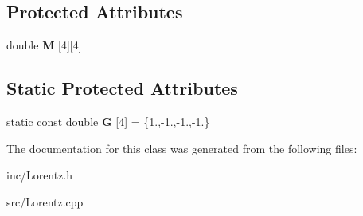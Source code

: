 \subsection*{Protected Attributes}
\begin{DoxyCompactItemize}
\item 
\hypertarget{classLT_adfe83a60779798fcb358f2fb12d79cda}{double {\bfseries M} \mbox{[}4\mbox{]}\mbox{[}4\mbox{]}}\label{classLT_adfe83a60779798fcb358f2fb12d79cda}

\end{DoxyCompactItemize}
\subsection*{Static Protected Attributes}
\begin{DoxyCompactItemize}
\item 
\hypertarget{classLT_a3ec591d3e26134d35eb127d0610c7866}{static const double {\bfseries G} \mbox{[}4\mbox{]} = \{1.,-\/1.,-\/1.,-\/1.\}}\label{classLT_a3ec591d3e26134d35eb127d0610c7866}

\end{DoxyCompactItemize}


The documentation for this class was generated from the following files\-:\begin{DoxyCompactItemize}
\item 
inc/Lorentz.\-h\item 
src/Lorentz.\-cpp\end{DoxyCompactItemize}
